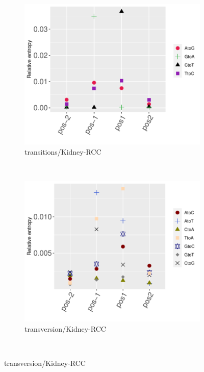 \begin{figure}[ht!]
    \begin{subfigure}{.5\textwidth}
    \includegraphics[scale=0.63]{graphics/nbr_transitions_Kidney-RCC.pdf}
    \caption{transitions/Kidney-RCC}
    \label{fig:transitions_kidney-rcc}
    \end{subfigure}
    ~
    \begin{subfigure}{.5\textwidth}
    \includegraphics[scale=0.63]{graphics/nbr_transversion_Kidney-RCC.pdf}
    \caption{transversion/Kidney-RCC}
    \label{fig:transversion_kidney-rcc}
    \end{subfigure} \\
    

\end{figure}
